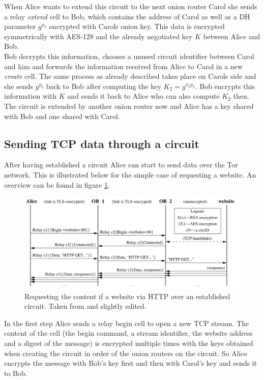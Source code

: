 When Alice wants to extend this circuit to the next onion router Carol she sends a relay \textit{extend} cell to Bob, which contains the address of Carol as well as a DH parameter \(g^{x_2}\) encrypted with Carols onion key. This data is encrypted symmetrically with AES-128 and the already negotiated key \(K\) between Alice and Bob.\\
Bob decrypts this information, chooses a unused circuit identifier between Carol and him and forwards the information received from Alice to Carol in a new \textit{create} cell. The same process as already described takes place on Carols side and she sends \(g^{y_2}\) back to Bob after computing the key \(K_2 = g^{x_2y_2}\). Bob encrypts this information with \(K\) and sends it back to Alice who can also compute \(K_2\) then. The circuit is extended by another onion router now and Alice has a key shared with Bob and one shared with Carol.

\subsection{Sending TCP data through a circuit}

After having established a circuit Alice can start to send data over the Tor network. This is illustrated below for the simple case of requesting a website. An overview can be found in figure \ref{img_http_request}.

\begin{figure}
	\includegraphics[width=\columnwidth]{img/http_request.png}
	\caption{Requesting the content if a website via HTTP over an established circuit. Taken from \cite{tor2004original} and slightly edited.}
	\label{img_http_request}
\end{figure}

In the first step Alice sends a relay begin cell to open a new TCP stream. The content of the cell (the begin command, a stream identifier, the website address and a digest of the message) is encrypted multiple times with the keys obtained when creating the circuit in order of the onion routers on the circuit. So Alice encrypts the message with Bob's key first and then with Carol's key and sends it to Bob.

